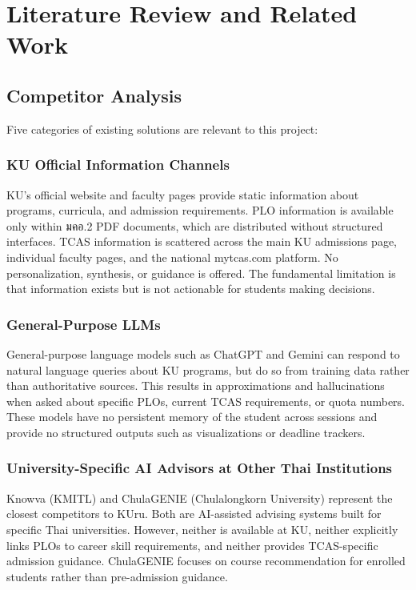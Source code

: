 \chapter{Literature Review and Related Work}
\label{chap:relatedworks}

\section{Competitor Analysis}
\label{section:competitor-analysis}

Five categories of existing solutions are relevant to this project:

\subsection{KU Official Information Channels}
\label{subsection:ku-official}

KU's official website and faculty pages provide static information about programs, curricula, and admission requirements. PLO information is available only within มคอ.2 PDF documents, which are distributed without structured interfaces. TCAS information is scattered across the main KU admissions page, individual faculty pages, and the national mytcas.com platform. No personalization, synthesis, or guidance is offered. The fundamental limitation is that information exists but is not actionable for students making decisions.

\subsection{General-Purpose LLMs}
\label{subsection:general-llms}

General-purpose language models such as ChatGPT and Gemini can respond to natural language queries about KU programs, but do so from training data rather than authoritative sources. This results in approximations and hallucinations when asked about specific PLOs, current TCAS requirements, or quota numbers. These models have no persistent memory of the student across sessions and provide no structured outputs such as visualizations or deadline trackers.

\subsection{University-Specific AI Advisors at Other Thai Institutions}
\label{subsection:thai-university-ai}

Knowva (KMITL) and ChulaGENIE (Chulalongkorn University) represent the closest competitors to KUru. Both are AI-assisted advising systems built for specific Thai universities. However, neither is available at KU, neither explicitly links PLOs to career skill requirements, and neither provides TCAS-specific admission guidance. ChulaGENIE focuses on course recommendation for enrolled students rather than pre-admission guidance.


